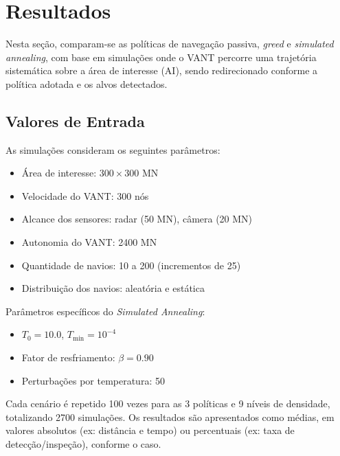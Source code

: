 \section{Resultados}

Nesta seção, comparam-se as políticas de navegação passiva, \textit{greed} e \textit{simulated annealing}, com base em simulações onde o VANT percorre uma trajetória sistemática sobre a área de interesse (AI), sendo redirecionado conforme a política adotada e os alvos detectados.

\subsection{Valores de Entrada}

As simulações consideram os seguintes parâmetros:

\begin{itemize}
    \item Área de interesse: $300 \times 300$ MN
    \item Velocidade do VANT: 300 nós
    \item Alcance dos sensores: radar (50 MN), câmera (20 MN)
    \item Autonomia do VANT: 2400 MN
    \item Quantidade de navios: 10 a 200 (incrementos de 25)
    \item Distribuição dos navios: aleatória e estática
\end{itemize}

Parâmetros específicos do \textit{Simulated Annealing}:

\begin{itemize}
    \item $T_0 = 10.0$, $T_{\text{min}} = 10^{-4}$
    \item Fator de resfriamento: $\beta = 0.90$
    \item Perturbações por temperatura: 50
\end{itemize}

Cada cenário é repetido 100 vezes para as 3 políticas e 9 níveis de densidade, totalizando 2700 simulações. Os resultados são apresentados como médias, em valores absolutos (ex: distância e tempo) ou percentuais (ex: taxa de detecção/inspeção), conforme o caso.


